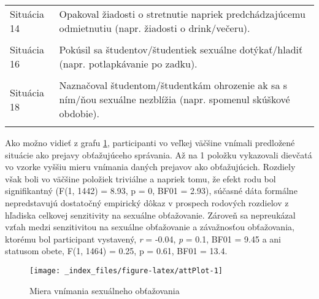 \documentclass[
]{article}
\begin{document}
\begin{table}[H]
{\begin{tabular}[t]{ll}
Situácia 14 & Opakoval žiadosti o stretnutie napriek predchádzajúcemu odmietnutiu (napr. žiadosti o drink/večeru).\\
\cellcolor{gray!6}{Situácia 15} & \cellcolor{gray!6}{Dotýkal sa študentov/študentiek spôsobom, ktorý v nich vyvolával nepríjemné pocity (napr. ruka cez plecia, okolo pása).}\\
\addlinespace
Situácia 16 & Pokúsil sa študentov/študentiek sexuálne dotýkať/hladiť (napr. potlapkávanie po zadku).\\
\cellcolor{gray!6}{Situácia 17} & \cellcolor{gray!6}{Naznačoval študentom/študentkám výhody za sexuálne zblíženie.}\\
Situácia 18 & Naznačoval študentom/študentkám ohrozenie ak sa s ním/ňou sexuálne nezblížia (napr. spomenul skúškové obdobie).\\
\cellcolor{gray!6}{Situácia 19} & \cellcolor{gray!6}{Vyvolával dojem, že sa mu/jej študenti/študentky musia podriadiť ak chcú, aby s nimi bolo zaobcházané dobre (napr. vyžadoval sexuále zblíženie).}\\
\bottomrule
\end{tabular}}
\end{table}

Ako možno vidieť z grafu \ref{fig:attPlot}, participanti vo veľkej väčšine vnímali predložené situácie ako prejavy obťažujúceho správania. Až na 1 položku vykazovali dievčatá vo vzorke vyššiu mieru vnímania daných prejavov ako obťažujúcich. Rozdiely však boli vo väčšine položiek triviálne a napriek tomu, že efekt rodu bol signifikantný (F(1, 1442) = 8.93, p = 0, BF01 = 2.93), súčasné dáta formálne nepredstavujú dostatočný empirický dôkaz v prospech rodových rozdielov z hľadiska celkovej senzitivity na sexuálne obťažovanie. Zároveň sa nepreukázal vzťah medzi senzitivitou na sexuálne obťažovanie a závažnosťou obťažovania, ktorému bol participant vystavený, \emph{r} = -0.04, \emph{p} = 0.1, BF01 = 9.45 a ani statusom obete, F(1, 1464) = 0.25, p = 0.61, BF01 = 13.4.

\begin{figure}

{\centering \texttt{[image: \_index\_files/figure-latex/attPlot-1]} 

}

\caption{Miera vnímania sexuálneho obťažovania}\label{fig:attPlot}
\end{figure}
\end{document}
